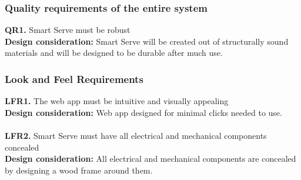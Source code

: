 \documentclass[12pt, titlepage]{article}
\begin{document}
\subsubsection{Quality requirements of the entire system}
    \noindent\textbf{QR1.} Smart Serve must be robust\\ 
    \indent\textbf{Design consideration:} Smart Serve will be created out of structurally sound materials and will be designed to be durable after much use.
\subsubsection{Look and Feel Requirements}
    \noindent\textbf{LFR1.} The web app must be intuitive and visually appealing \\
    \indent\textbf{Design consideration:} Web app designed for minimal clicks needed to use.\\\\
    \textbf{LFR2.} Smart Serve must have all electrical and mechanical components concealed \\
    \indent\textbf{Design consideration:} All electrical and mechanical components are concealed by designing a wood frame around them.
\end{document}
